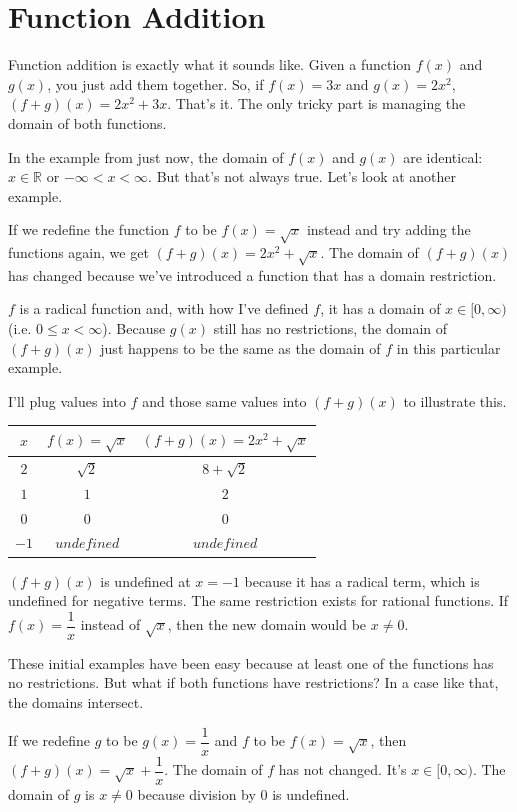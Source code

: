 \clearpage\section{Function Addition}
Function addition is exactly what it sounds like. Given a function $f(x)$ and $g(x)$, you just add them together. So, if $f(x) = 3x$ and $g(x) = 2x^2$, $(f + g)(x) = 2x^2 + 3x$. That's it. The only tricky part is managing the domain of both functions. 

In the example from just now, the domain of $f(x)$ and $g(x)$ are identical: $x \in \mathbb{R}$ or $-\infty < x < \infty$. But that's not always true. Let's look at another example.

If we redefine the function $f$ to be $f(x) = \sqrt{x}$ instead and try adding the functions again, we get $(f + g)(x) = 2x^2 + \sqrt{x}$. The domain of $(f + g)(x)$ has changed because we've introduced a function that has a domain restriction. 

$f$ is a radical function and, with how I've defined $f$, it has a domain of $x \in [0, \infty)$ (i.e. $0 \le x < \infty$). Because $g(x)$ still has no restrictions, the domain of $(f + g)(x)$ just happens to be the same as the domain of $f$ in this particular example.

I'll plug values into $f$ and those same values into $(f + g)(x)$ to illustrate this.
\begin{center}
\begin{tabular}{ c | c | c }
    $x$ & $f(x) = \sqrt{x}$ & $(f + g)(x) = 2x^2 + \sqrt{x}$ \\
    \hline
    $2$ & $\sqrt{2}$ & $8 + \sqrt{2}$ \\
    \hline
    $1$ & $1$ & $2$ \\
    \hline
    $0$ & $0$ & $0$ \\
    \hline
    $-1$ & $undefined$ & $undefined$
\end{tabular}
\end{center}
$(f + g)(x)$ is undefined at $x = -1$ because it has a radical term, which is undefined for negative terms. The same restriction exists for rational functions. If $f(x) = \dfrac{1}{x}$ instead of $\sqrt{x}$, then the new domain would be $x \neq 0$.

These initial examples have been easy because at least one of the functions has no restrictions. But what if both functions have restrictions? In a case like that, the domains intersect. \clearpage

If we redefine $g$ to be $g(x) = \dfrac{1}{x}$ and $f$ to be $f(x) = \sqrt{x}$, then \\$\displaystyle (f + g)(x) = \sqrt{x} + \dfrac{1}{x}$. The domain of $f$ has not changed. It's $x \in [0, \infty)$. The domain of $g$ is $x \neq 0$ because division by $0$ is undefined.

